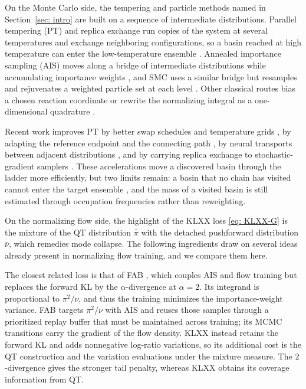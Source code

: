 \documentclass{article}
\begin{document}
On the Monte Carlo side, the tempering and particle methods named in Section~\ref{sec: intro} are built on a sequence of intermediate distributions. Parallel tempering (PT) and replica exchange run copies of the system at several temperatures and exchange neighboring configurations, so a basin reached at high temperature can enter the low-temperature ensemble \citep{swendsen1986replica,geyer1991markov,hukushima1996exchange}. Annealed importance sampling (AIS) moves along a bridge of intermediate distributions while accumulating importance weights \citep{neal2001annealed}, and SMC uses a similar bridge but resamples and rejuvenates a weighted particle set at each level \citep{doucet2001introduction,delmoral2006sequential}. Other classical routes bias a chosen reaction coordinate \citep{torrie1977umbrella,kastner2011umbrella} or rewrite the normalizing integral as a one-dimensional quadrature \citep{skilling2006nested}.

Recent work improves PT by better swap schedules and temperature grids \citep{syed2022nonreversible}, by adapting the reference endpoint and the connecting path \citep{surjanovic2022variational}, by neural transports between adjacent distributions \citep{zhang2025accelerated}, and by carrying replica exchange to stochastic-gradient samplers \citep{chen2019accelerating,deng2020nonconvex,deng2021variance,dong2021replica}. These accelerations move a discovered basin through the ladder more efficiently, but two limits remain: a basin that no chain has visited cannot enter the target ensemble \citep{woodard2009conditions,chehab2024provable}, and the mass of a visited basin is still estimated through occupation frequencies rather than reweighting.

On the normalizing flow side, the highlight of the KLXX loss \eqref{eq: KLXX-G} is the mixture of the QT distribution $\hat\pi$ with the detached pushforward distribution $\bar\nu$, which remedies mode collapse. The following ingredients draw on several ideas already present in normalizing flow training, and we compare them here.

The closest related loss is that of FAB \citep{midgley2022flow}, which couples AIS and flow training but replaces the forward KL by the $\alpha$-divergence at $\alpha=2$. Its integrand is proportional to $\pi^2/\nu$, and thus the training minimizes the importance-weight variance. FAB targets $\pi^2/\nu$ with AIS and reuses those samples through a prioritized replay buffer that must be maintained across training; its MCMC transitions carry the gradient of the flow density. KLXX instead retains the forward KL and adds nonnegative log-ratio variations, so its additional cost is the QT construction and the variation evaluations under the mixture measure. The $2$-divergence gives the stronger tail penalty, whereas KLXX obtains its coverage information from QT.
\end{document}
